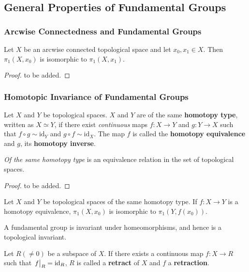 \documentclass[10pt]{article}
\begin{document}
\subsection{General Properties of Fundamental Groups}
\subsubsection{Arcwise Connectedness and Fundamental Groups}
\begin{theorem}
    Let $X$ be an arcwise connected topological space and let $x_0,x_1\in X$.
    Then $\pi_1(X,x_0)$ is isomorphic to $\pi_1(X,x_1)$.
\end{theorem}
\begin{proof}
    to be added.
\end{proof}

\subsubsection{Homotopic Invariance of Fundamental Groups}

\begin{definition}
    Let $X$ and $Y$ be topological spaces.
    $X$ and $Y$ are of the same \textbf{homotopy type}, written as $X\simeq Y$, if there exist \textit{continuous} maps $f:X\to Y$ and $g:Y\to X$ such that $f\circ g\sim\text{id}_Y$ and $g\circ f\sim\text{id}_X$.
    The map $f$ is called the \textbf{homotopy equivalence} and $g$, its \textbf{homotopy inverse}.
\end{definition}

\begin{proposition}
    \textit{Of the same homotopy type} is an equivalence relation in the set of topological spaces.
\end{proposition}
\begin{proof}
    to be added.
\end{proof}

\begin{theorem}
    Let $X$ and $Y$ be topological spaces of the same homotopy type.
    If $f:X\to Y$ is a homotopy equivalence, $\pi_1(X,x_0)$ is isomorphic to $\pi_1(Y,f(x_0))$.
\end{theorem}

\begin{corollary}
    A fundamental group is invariant under homeomorphisms, and hence is a topological invariant.
\end{corollary}

\begin{definition}
    Let $R(\neq0)$ be a subspace of $X$.
    If there exists a continuous map $f:X\to R$ such that $\eval{f}_{R}=\text{id}_R$, $R$ is called a \textbf{retract} of $X$ and $f$ a \textbf{retraction}.
\end{definition}
\end{document}
